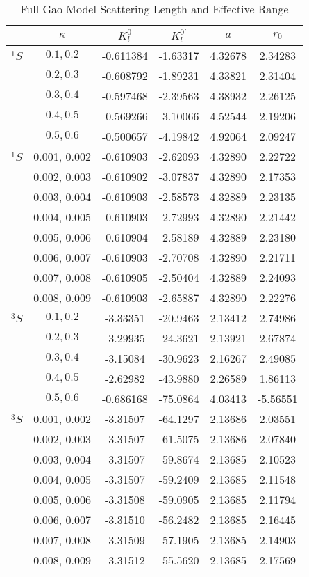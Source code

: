 \documentclass[Dissertation.tex]{subfiles}
\begin{document}
\begin{table}[H]
\begin{center}
\begin{tabular}{c c c c c c}
\toprule
\toprule
& $\kappa$ & $K_l^0$ & $K_l^{0\prime}$ & $a$ & $r_0$ \\
\midrule
$^1S$ & $0.1, 0.2$ & -0.611384 & -1.63317 & 4.32678 & 2.34283 \\
 & $0.2, 0.3$ & -0.608792 & -1.89231 & 4.33821 & 2.31404 \\
 & $0.3, 0.4$ & -0.597468 & -2.39563 & 4.38932 & 2.26125 \\
 & $0.4, 0.5$ & -0.569266 & -3.10066 & 4.52544 & 2.19206 \\
 & $0.5, 0.6$ & -0.500657 & -4.19842 & 4.92064 & 2.09247 \\
\midrule
$^1S$ & 0.001, 0.002 & -0.610903 & -2.62093 & 4.32890 & 2.22722 \\
 & 0.002, 0.003 & -0.610902 & -3.07837 & 4.32890 & 2.17353 \\
 & 0.003, 0.004 & -0.610903 & -2.58573 & 4.32889 & 2.23135 \\
 & 0.004, 0.005 & -0.610903 & -2.72993 & 4.32890 & 2.21442 \\
 & 0.005, 0.006 & -0.610904 & -2.58189 & 4.32889 & 2.23180 \\
 & 0.006, 0.007 & -0.610903 & -2.70708 & 4.32890 & 2.21711 \\
 & 0.007, 0.008 & -0.610905 & -2.50404 & 4.32889 & 2.24093 \\
 & 0.008, 0.009 & -0.610903 & -2.65887 & 4.32890 & 2.22276 \\
\midrule
\midrule
$^3S$ & $0.1, 0.2$ & -3.33351 & -20.9463 & 2.13412 & 2.74986 \\
 & $0.2, 0.3$ & -3.29935 & -24.3621 & 2.13921 & 2.67874 \\
 & $0.3, 0.4$ & -3.15084 & -30.9623 & 2.16267 & 2.49085 \\
 & $0.4, 0.5$ & -2.62982 & -43.9880 & 2.26589 & 1.86113 \\
 & $0.5, 0.6$ & -0.686168 & -75.0864 & 4.03413 & -5.56551 \\
\midrule
$^3S$ & 0.001, 0.002 & -3.31507 & -64.1297 & 2.13686 & 2.03551 \\
 & 0.002, 0.003 & -3.31507 & -61.5075 & 2.13686 & 2.07840 \\
 & 0.003, 0.004 & -3.31507 & -59.8674 & 2.13685 & 2.10523 \\
 & 0.004, 0.005 & -3.31507 & -59.2409 & 2.13685 & 2.11548 \\
 & 0.005, 0.006 & -3.31508 & -59.0905 & 2.13685 & 2.11794 \\
 & 0.006, 0.007 & -3.31510 & -56.2482 & 2.13685 & 2.16445 \\
 & 0.007, 0.008 & -3.31509 & -57.1905 & 2.13685 & 2.14903 \\
 & 0.008, 0.009 & -3.31512 & -55.5620 & 2.13685 & 2.17569 \\
\bottomrule
\bottomrule
\end{tabular}
\caption{Full Gao Model Scattering Length and Effective Range}
\label{tab:GaoResults}
\end{center}
\end{table}
\end{document}
